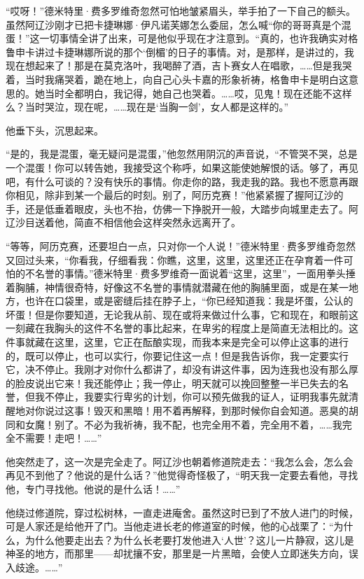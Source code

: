 \par “哎呀！”德米特里·费多罗维奇忽然可怕地皱紧眉头，举手拍了一下自己的额头。虽然阿辽沙刚才已把卡捷琳娜·伊凡诺芙娜怎么委屈，怎么喊“你的哥哥真是个混蛋！”这一切事情全讲了出来，可是他似乎现在才注意到。“真的，也许我确实对格鲁申卡讲过卡捷琳娜所说的那个‘倒楣’的日子的事情。对，是那样，是讲过的，我现在想起来了！那是在莫克洛叶，我喝醉了酒，吉卜赛女人在唱歌，……但是我哭着，当时我痛哭着，跪在地上，向自己心头卡嘉的形象祈祷，格鲁申卡是明白这意思的。她当时全都明白，我记得，她自己也哭着。……哎，见鬼！现在还能不这样么？当时哭泣，现在呢，……现在是‘当胸一剑’，女人都是这样的。”
\par 他垂下头，沉思起来。
\par “是的，我是混蛋，毫无疑问是混蛋，”他忽然用阴沉的声音说，“不管哭不哭，总是一个混蛋！你可以转告她，我接受这个称呼，如果这能使她解恨的话。够了，再见吧，有什么可谈的？没有快乐的事情。你走你的路，我走我的路。我也不愿意再跟你相见，除非到某一个最后的时刻。别了，阿历克赛！”他紧紧握了握阿辽沙的手，还是低垂着眼皮，头也不抬，仿佛一下挣脱开一般，大踏步向城里走去了。阿辽沙目送着他，简直不相信他会这样突然永远离开了。
\par “等等，阿历克赛，还要坦白一点，只对你一个人说！”德米特里·费多罗维奇忽然又回过头来，“你看我，仔细看我：你瞧，这里，这里，这里还正在孕育着一件可怕的不名誉的事情。”德米特里·费多罗维奇一面说着“这里，这里”，一面用拳头捶着胸脯，神情很奇特，好像这不名誉的事情就潜藏在他的胸脯里面，或是在某一地方，也许在口袋里，或是密缝后挂在脖子上，“你已经知道我：我是坏蛋，公认的坏蛋！但是你要知道，无论我从前、现在或将来做过什么事，它和现在，和眼前这一刻藏在我胸头的这件不名誉的事比起来，在卑劣的程度上是简直无法相比的。这件事就藏在这里，这里，它正在酝酿实现，而我本来是完全可以停止这事的进行的，既可以停止，也可以实行，你要记住这一点！但是我告诉你，我一定要实行它，决不停止。我刚才对你什么都讲了，却没有讲这件事，因为连我也没有那么厚的脸皮说出它来！我还能停止；我一停止，明天就可以挽回整整一半已失去的名誉，但我不停止，我要实行卑劣的计划，你可以预先做我的证人，证明我事先就清醒地对你说过这事！毁灭和黑暗！用不着再解释，到那时候你自会知道。恶臭的胡同和女魔！别了。不必为我祈祷，我不配，也完全用不着，完全用不着，……我完全不需要！走吧！……”
\par 他突然走了，这一次是完全走了。阿辽沙也朝着修道院走去：“我怎么会，怎么会再见不到他了？他说的是什么话？”他觉得奇怪极了，“明天我一定要去看他，寻找他，专门寻找他。他说的是什么话！……”
\par 他绕过修道院，穿过松树林，一直走进庵舍。虽然这时已到了不放人进门的时候，可是人家还是给他开了门。当他走进长老的修道室的时候，他的心战栗了：“为什么，为什么他要走出去？为什么长老要打发他进入‘人世’？这儿一片静寂，这儿是神圣的地方，而那里——却扰攘不安，那里是一片黑暗，会使人立即迷失方向，误入歧途。……”
